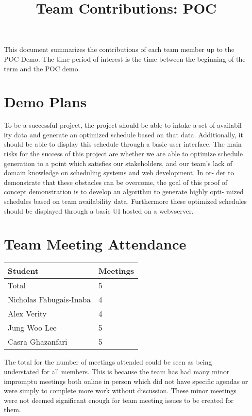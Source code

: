 \documentclass{article}
\title{Team Contributions: POC\\\progname}
\author{\authname}
\date{}
\begin{document}
\maketitle

This document summarizes the contributions of each team member up to the POC
Demo.  The time period of interest is the time between the beginning of the term
and the POC demo.

\section{Demo Plans}

To be a successful project, the project should be able to intake a set of availabil-
ity data and generate an optimized schedule based on that data. Additionally,
it should be able to display this schedule through a basic user interface. The
main risks for the success of this project are whether we are able to optimize
schedule generation to a point which satisfies our stakeholders, and our team’s
lack of domain knowledge on scheduling systems and web development. In or-
der to demonstrate that these obstacles can be overcome, the goal of this proof
of concept demonstration is to develop an algorithm to generate highly opti-
mized schedules based on team availability data. Furthermore these optimized
schedules should be displayed through a basic UI hosted on a webvserver.

\section{Team Meeting Attendance}

\begin{table}[H]
\centering
\begin{tabular}{ll}
\toprule
\textbf{Student} & \textbf{Meetings}\\
\midrule
Total & 5\\
Nicholas Fabugais-Inaba & 4 \\
Alex Verity & 4 \\
Jung Woo Lee & 5 \\
Casra Ghazanfari & 5 \\
\bottomrule
\end{tabular}
\end{table}

The total for the number of meetings attended could be seen as
being understated for all members. This is because the team has 
had many minor impromptu meetings both online in person which 
did not have specific agendas or were simply to complete more work
without discussion. These minor meetings were not deemed significant
enough for team meeting issues to be created for them.
\end{document}
